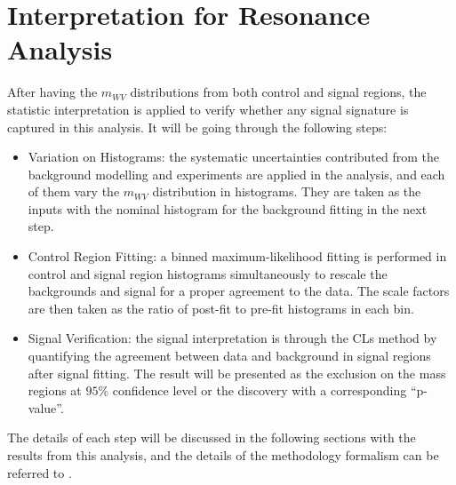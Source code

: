 \chapter{Interpretation for Resonance Analysis}
\label{Ch:resonance_stat}
After having the $m_{WV}$ distributions from both control and signal regions, the statistic interpretation is applied to verify whether any signal signature is captured in this analysis. It will be going through the following steps:

\begin{itemize}
	\item{Variation on Histograms}: the systematic uncertainties contributed from the background modelling and experiments are applied in the analysis, and each of them vary the $m_{WV}$ distribution in histograms. They are taken as the inputs with the nominal histogram for the background fitting in the next step.

	\item{Control Region Fitting}: a binned maximum-likelihood fitting is performed in control and signal region histograms simultaneously to rescale the backgrounds and signal for a proper agreement to the data. The scale factors are then taken as the ratio of post-fit to pre-fit histograms in each bin. 
	
	\item{Signal Verification}: the signal interpretation is through the CLs method by quantifying the agreement between data and background in signal regions after signal fitting. The result will be presented as the exclusion on the mass regions at $95\%$ confidence level or the discovery with a corresponding ``p-value''.
\end{itemize}
The details of each step will be discussed in the following sections with the results from this analysis, and the details of the methodology formalism can be referred to \cite{StatisticsData}.
